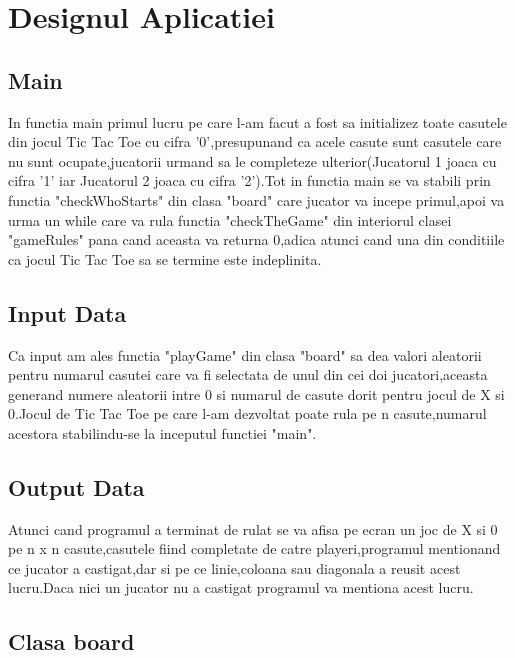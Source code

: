 \documentclass[12]{article}
\begin{document}
\newpage
\section{Designul Aplicatiei}
\subsection{Main}
\textbf{}
\newline

In functia main  primul lucru pe care l-am facut a fost sa initializez toate casutele din jocul Tic Tac Toe cu cifra '0',presupunand ca acele casute sunt casutele care nu sunt ocupate,jucatorii urmand sa le completeze ulterior(Jucatorul 1 joaca cu cifra '1' iar Jucatorul 2 joaca cu cifra '2').Tot in functia main se va stabili prin functia "checkWhoStarts" din clasa "board" care jucator va incepe primul,apoi va urma un while care va rula functia "checkTheGame" din interiorul clasei "gameRules" pana cand aceasta va returna 0,adica atunci cand una din conditiile ca jocul Tic Tac Toe sa se termine este indeplinita.

\subsection{Input Data}
\textcolor{white}{}

Ca input am ales functia "playGame" din clasa "board" sa dea valori aleatorii pentru numarul casutei care va fi selectata de unul din cei doi jucatori,aceasta generand numere aleatorii intre 0 si numarul de casute dorit pentru jocul de X si 0.Jocul de Tic Tac Toe pe care l-am dezvoltat poate rula pe n casute,numarul acestora stabilindu-se la inceputul functiei "main".

\subsection{Output Data}
\textcolor{white}{}

Atunci cand programul a terminat de rulat se va afisa pe ecran un joc de X si 0 pe n x n casute,casutele fiind completate de catre playeri,programul mentionand ce jucator a castigat,dar si pe ce linie,coloana sau diagonala a reusit acest lucru.Daca nici un jucator nu a castigat programul va mentiona acest lucru.

\subsection{Clasa board}
\end{document}
